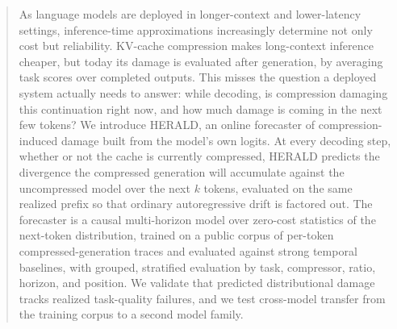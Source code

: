 \begin{abstract}
As language models are deployed in longer-context and lower-latency settings,
inference-time approximations increasingly determine not only cost but
reliability. KV-cache compression makes long-context inference cheaper, but
today its damage is evaluated after generation, by averaging task scores over
completed outputs. This misses the question a deployed system actually needs
to answer: while decoding, is compression damaging this continuation right
now, and how much damage is coming in the next few tokens? We introduce
HERALD, an online forecaster of compression-induced damage built from the
model's own logits. At every decoding step, whether or not the cache is
currently compressed, HERALD predicts the divergence the compressed
generation will accumulate against the uncompressed model over the next $k$
tokens, evaluated on the same realized prefix so that ordinary autoregressive
drift is factored out. The forecaster is a causal multi-horizon model over
zero-cost statistics of the next-token distribution, trained on a public
corpus of per-token compressed-generation traces and evaluated against strong
temporal baselines, with grouped, stratified evaluation by task, compressor,
ratio, horizon, and position. We validate that predicted distributional
damage tracks realized task-quality failures, and we test cross-model
transfer from the training corpus to a second model family.
\end{abstract}
